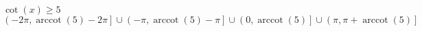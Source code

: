 { $\cot(x) \geq 5$ }
{ $\left(-2\pi, \operatorname{arccot}(5) - 2\pi\right] \cup \left(-\pi, \operatorname{arccot}(5) - \pi\right] \cup \left(0, \operatorname{arccot}(5)\right] \cup \left(\pi, \pi + \operatorname{arccot}(5)\right]$}
